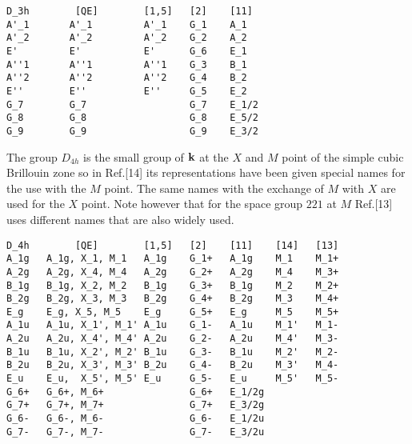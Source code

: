 \documentclass[12pt,a4paper,twoside]{report}
\begin{document}
\begin{tcolorbox}
\begin{footnotesize}
\begin{verbatim}
D_3h        [QE]        [1,5]   [2]    [11]
A'_1       A'_1         A'_1    G_1    A_1
A'_2       A'_2         A'_2    G_2    A_2
E'         E'           E'      G_6    E_1
A''1       A''1         A''1    G_3    B_1
A''2       A''2         A''2    G_4    B_2
E''        E''          E''     G_5    E_2
G_7        G_7                  G_7    E_1/2
G_8        G_8                  G_8    E_5/2
G_9        G_9                  G_9    E_3/2
\end{verbatim}
\end{footnotesize}
\end{tcolorbox}

The group $D_{4h}$ is the small group of ${\bf k}$ at the $X$ and $M$
point of the simple cubic Brillouin zone so in Ref.[14] its representations 
have been given special names for the use with the $M$ point. The same names 
with the exchange of $M$ with $X$ are used for the $X$ point. Note however
that for the space group $221$ at $M$ Ref.[13] uses different names that
are also widely used.

\begin{tcolorbox}
\begin{footnotesize}
\begin{verbatim}
D_4h        [QE]        [1,5]   [2]    [11]    [14]   [13]
A_1g   A_1g, X_1, M_1   A_1g    G_1+   A_1g    M_1    M_1+
A_2g   A_2g, X_4, M_4   A_2g    G_2+   A_2g    M_4    M_3+
B_1g   B_1g, X_2, M_2   B_1g    G_3+   B_1g    M_2    M_2+
B_2g   B_2g, X_3, M_3   B_2g    G_4+   B_2g    M_3    M_4+
E_g    E_g, X_5, M_5    E_g     G_5+   E_g     M_5    M_5+
A_1u   A_1u, X_1', M_1' A_1u    G_1-   A_1u    M_1'   M_1-  
A_2u   A_2u, X_4', M_4' A_2u    G_2-   A_2u    M_4'   M_3-
B_1u   B_1u, X_2', M_2' B_1u    G_3-   B_1u    M_2'   M_2-
B_2u   B_2u, X_3', M_3' B_2u    G_4-   B_2u    M_3'   M_4-
E_u    E_u,  X_5', M_5' E_u     G_5-   E_u     M_5'   M_5-
G_6+   G_6+, M_6+               G_6+   E_1/2g
G_7+   G_7+, M_7+               G_7+   E_3/2g
G_6-   G_6-, M_6-               G_6-   E_1/2u
G_7-   G_7-, M_7-               G_7-   E_3/2u
\end{verbatim}
\end{footnotesize}
\end{tcolorbox}
\end{document}
